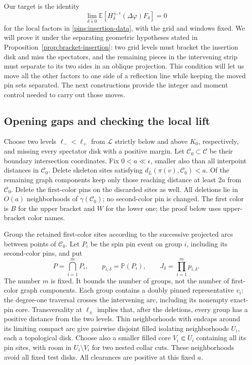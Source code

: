 \documentclass[11pt]{article}
\newcommand{\E}{\mathbb E}
\newcommand{\Prob}{\mathbb P}
\theoremstyle{definition}
\theoremstyle{remark}
\numberwithin{equation}{section}
\begin{document}
Our target is the identity
\begin{equation}\label{eq:bracket-insertion}
 \lim_{\delta\downarrow0}
 \E\left[H_\delta^{\pm,\epsilon}(\Delta\varphi)
                       F_\delta\right]=0
\end{equation}
for the local factors in \eqref{pins:insertion-data}, with the grid and
windows fixed.  We will prove it under the separating geometric
hypotheses stated in Proposition~\ref{prop:bracket-insertion}: two grid
levels must bracket the insertion disk and miss the spectators, and the
remaining pieces in the intervening strip must separate to its two
sides in an oblique projection.  This condition will let us move all the
other factors to one side of a reflection line while keeping the moved
pin sets separated.  The next constructions provide the
integer and moment control needed to carry out those moves.

\subsection{Opening gaps and checking the local lift}

Choose two levels $\ell_-<\ell_+$ from $\mathcal L$ strictly below and
above $K_0$, respectively, and missing every spectator disk with a
positive margin.  Let $\mathcal C_0\subset\mathcal C$ be their boundary
intersection coordinates.  Fix $0<a\ll\epsilon$, smaller also than all
interpoint distances in $\mathcal C_0$.  Delete skeleton sites satisfying
$d_L(\pi(v),\mathcal C_0)<a$.  Of the remaining graph components keep
only those reaching distance at least $2a$ from $\mathcal C_0$.  Delete
the first-color pins on the discarded sites as well.  All deletions
lie in $O(a)$ neighborhoods of $\gamma(\mathcal C_0)$; no second-color
pin is changed.  The first color is $B$ for the upper bracket and $W$
for the lower one; the proof below uses upper-bracket color names.

Group the retained first-color sites according to the successive
projected arcs between points of $\mathcal C_0$.  Let $P_i$ be the spin
pin event on group $i$, including its second-color pins, and put
\begin{equation}\label{pins:rare-normalization}
 P=\bigcap_{i=1}^m P_i,\qquad p_{i,\delta}=\Prob(P_i),\qquad
 J_\delta=\prod_{i=1}^m p_{i,\delta}.
\end{equation}
The number $m$ is fixed.  It bounds the number of groups, not the number
of first-color graph components.  Each group contains a doubly pinned
representative $v_i$: the degree-one traversal crosses the intervening
arc, including its nonempty exact-pin core.  Transversality at
$\ell_\pm$ implies that, after the deletions, every group has a
positive distance from the two levels.  Thin neighborhoods with endcaps
around its limiting compact arc give pairwise disjoint filled isolating
neighborhoods $U_i$, each a topological disk.  Choose also a smaller
filled core $V_i\Subset U_i$ containing all its pin sites, with room
in $U_i\setminus V_i$ for two nested collar cuts.  These neighborhoods
avoid all fixed test disks.  All clearances are positive at this fixed
$a$.
\end{document}
